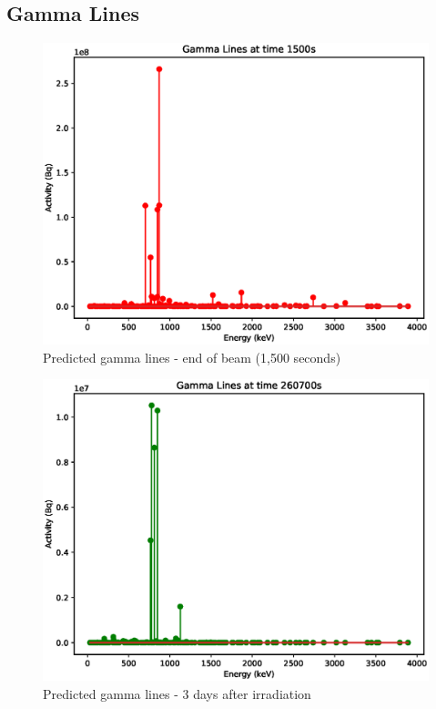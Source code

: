 \FloatBarrier
\clearpage

\subsection{Gamma Lines}

\begin{figure}[htb]
\centering
\includegraphics[width=0.5\linewidth]{chapters/activity_code/mo-john-hewett/thick/gammas/0100_1500.eps}
\caption{Predicted gamma lines - end of beam (1,500 seconds)}
\label{fig:mogammalines1500s}
\end{figure}

\begin{figure}[htb]
\centering
\includegraphics[width=0.5\linewidth]{chapters/activity_code/mo-john-hewett/thick/gammas/0400_260700.eps}
\caption{Predicted gamma lines - 3 days after irradiation}
\label{fig:mogammalines3days}
\end{figure}



